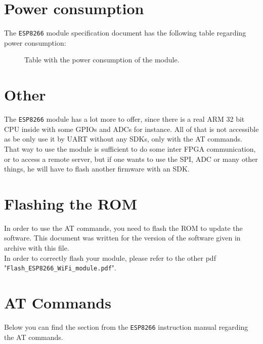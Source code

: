 \documentclass[11pt]{article}
\begin{document}
\section{Power consumption}
The \texttt{ESP8266} module specification document has the following table regarding power consumption:
\begin{figure}[H]
    \caption{Table with the power consumption of the module.}
\end{figure}

\section{Other}
The \texttt{ESP8266} module has a lot more to offer, since there is a real ARM 32 bit CPU inside with some GPIOs and ADCs for instance. All of that is not accessible as be only use it by UART without any SDKs, only with the AT commands. That way to use the module is sufficient to do some inter FPGA communication, or to access a remote server, but if one wants to use the SPI, ADC or many other things, he will have to flash another firmware with an SDK.
\newpage
\begin{appendices}
\section{Flashing the ROM}
In order to use the AT commands, you need to flash the ROM to update the software. This document was written for the version of the software given in archive with this file.\\
In order to correctly flash your module, please refer to the other pdf "\texttt{Flash\_ESP8266\_WiFi\_module.pdf}".
\section{AT Commands}
Below you can find the section from the \texttt{ESP8266} instruction manual regarding the AT commands.




\end{appendices}
\end{document}
